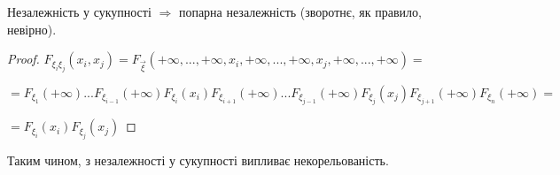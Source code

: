 \begin{proposition}
    Незалежність у сукупності $\Rightarrow$ попарна незалежність
    (зворотнє, як правило, невірно).
\end{proposition}
\begin{proof}
    $F_{\xi_i\xi_j}(x_i, x_j) = F_{\vec{\xi}}(+\infty, ..., +\infty, x_i, 
    +\infty, ..., +\infty, x_j, +\infty, ..., +\infty) = $

    $= F_{\xi_1}(+\infty)...F_{\xi_{i-1}}(+\infty)F_{\xi_i}(x_i)
    F_{\xi_{i+1}}(+\infty)...F_{\xi_{j-1}}(+\infty)F_{\xi_{j}}(x_j)
    F_{\xi_{j+1}}(+\infty)F_{\xi_n}(+\infty) = $
    
    $= F_{\xi_i}(x_i)F_{\xi_j}(x_j)$
\end{proof}

Таким чином, з незалежності у сукупності випливає некорельованість.